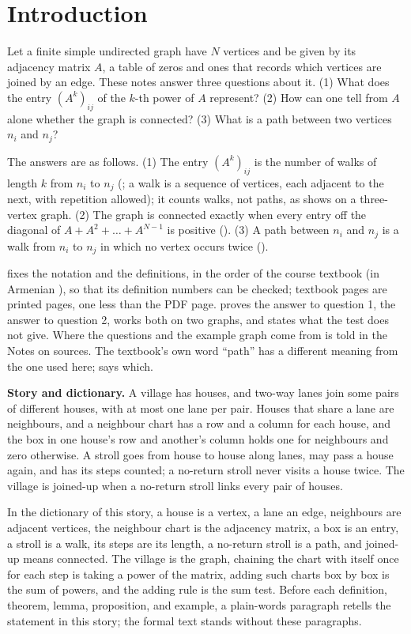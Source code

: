 \section{Introduction}\label{sec:introduction}

Let a finite simple undirected graph have $N$ vertices and be given by its adjacency matrix $A$, a table of zeros and ones that records which vertices are joined by an edge. These notes answer three questions about it. (1) What does the entry $(A^k)_{ij}$ of the $k$-th power of $A$ represent? (2) How can one tell from $A$ alone whether the graph is connected? (3) What is a path between two vertices $n_i$ and $n_j$?

The answers are as follows. (1) The entry $(A^k)_{ij}$ is the number of walks of length $k$ from $n_i$ to $n_j$ (; a walk is a sequence of vertices, each adjacent to the next, with repetition allowed); it counts walks, not paths, as  shows on a three-vertex graph. (2) The graph is connected exactly when every entry off the diagonal of $A + A^2 + \dots + A^{N-1}$ is positive (). (3) A path between $n_i$ and $n_j$ is a walk from $n_i$ to $n_j$ in which no vertex occurs twice ().

 fixes the notation and the definitions, in the order of the course textbook (in Armenian \cite{petrosyan_graph_theory}), so that its definition numbers can be checked; textbook pages are printed pages, one less than the PDF page.  proves the answer to question 1,  the answer to question 2,  works both on two graphs, and  states what the test does not give. Where the questions and the example graph come from is told in the Notes on sources. The textbook's own word ``path'' has a different meaning from the one used here;  says which.

\medskip
\noindent\textbf{Story and dictionary.} A village has houses, and two-way lanes join some pairs of different houses, with at most one lane per pair. Houses that share a lane are neighbours, and a neighbour chart has a row and a column for each house, and the box in one house's row and another's column holds one for neighbours and zero otherwise. A stroll goes from house to house along lanes, may pass a house again, and has its steps counted; a no-return stroll never visits a house twice. The village is joined-up when a no-return stroll links every pair of houses.

\noindent In the dictionary of this story, a house is a vertex, a lane an edge, neighbours are adjacent vertices, the neighbour chart is the adjacency matrix, a box is an entry, a stroll is a walk, its steps are its length, a no-return stroll is a path, and joined-up means connected. The village is the graph, chaining the chart with itself once for each step is taking a power of the matrix, adding such charts box by box is the sum of powers, and the adding rule is the sum test. Before each definition, theorem, lemma, proposition, and example, a plain-words paragraph retells the statement in this story; the formal text stands without these paragraphs.

